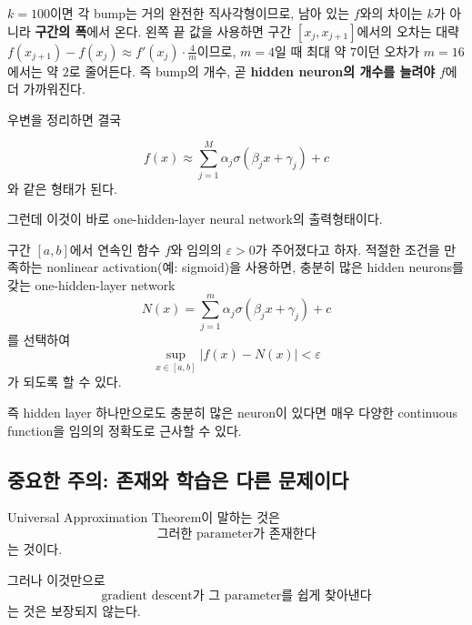 \documentclass[11pt,a4paper]{article}
\newcommand{\sigmoid}{\sigma}
\begin{document}
\begin{center}
\end{center}

$k=100$이면 각 bump는 거의 완전한 직사각형이므로,
남아 있는 $f$와의 차이는 $k$가 아니라 \textbf{구간의 폭}에서 온다.
왼쪽 끝 값을 사용하면 구간 $[x_j,x_{j+1}]$에서의 오차는 대략
$f(x_{j+1})-f(x_j)\approx f'(x_j)\cdot\tfrac{4}{m}$이므로,
$m=4$일 때 최대 약 $7$이던 오차가 $m=16$에서는 약 $2$로 줄어든다.
즉 bump의 개수, 곧 \textbf{hidden neuron의 개수를 늘려야} $f$에 더 가까워진다.

우변을 정리하면 결국

\[
\boxed{
f(x)
\approx
\sum_{j=1}^{M}
\alpha_j
\sigmoid(\beta_jx+\gamma_j)
+c
}
\]
와 같은 형태가 된다.

그런데 이것이 바로 one-hidden-layer neural network의 출력형태이다.

\begin{mlbox}
구간 $[a,b]$에서 연속인 함수 $f$와 임의의 $\varepsilon>0$가 주어졌다고 하자.
적절한 조건을 만족하는 nonlinear activation(예: sigmoid)을 사용하면,
충분히 많은 hidden neurons를 갖는 one-hidden-layer network
\[
N(x)
=
\sum_{j=1}^{m}
\alpha_j
\sigmoid(\beta_jx+\gamma_j)
+c
\]
를 선택하여
\[
\boxed{
\sup_{x\in[a,b]}|f(x)-N(x)|<\varepsilon
}
\]
가 되도록 할 수 있다.
\end{mlbox}

즉 hidden layer 하나만으로도 충분히 많은 neuron이 있다면
매우 다양한 continuous function을 임의의 정확도로 근사할 수 있다.

\subsection{중요한 주의: 존재와 학습은 다른 문제이다}

Universal Approximation Theorem이 말하는 것은
\[
\boxed{
\text{그러한 parameter가 존재한다}
}
\]
는 것이다.

그러나 이것만으로
\[
\boxed{
\text{gradient descent가 그 parameter를 쉽게 찾아낸다}
}
\]
는 것은 보장되지 않는다.
\end{document}

